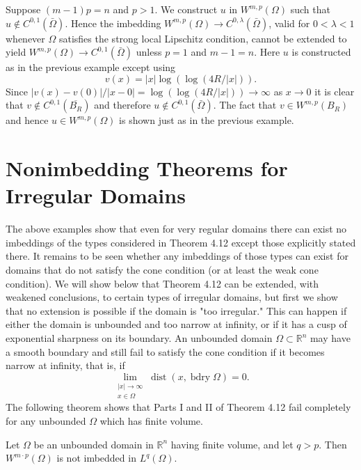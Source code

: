 \begin{example}
  Suppose $(m-1) p=n$ and $p>1$. We construct $u$ in $W^{m, p}(\Omega)$ such that $u \notin C^{0,1}(\bar{\Omega})$. Hence the imbedding $W^{m, p}(\Omega) \rightarrow C^{0, \lambda}(\bar{\Omega})$, valid for $0<\lambda<1$ whenever $\Omega$ satisfies the strong local Lipschitz condition,
  cannot be extended to yield $W^{m, p}(\Omega) \rightarrow C^{0,1}(\bar{\Omega})$ unless $p=1$ and $m-1=n$. Here $u$ is constructed as in the previous example except using
  \[
  v(x)=|x| \log (\log (4 R /|x|)) .
  \]
  Since $|v(x)-v(0)| /|x-0|=\log (\log (4 R /|x|)) \rightarrow \infty$ as $x \rightarrow 0$ it is clear that $v \notin C^{0,1}\left(\overline{B_R}\right)$ and therefore $u \notin C^{0,1}(\bar{\Omega})$. The fact that $v \in W^{m, p}\left(B_R\right)$ and hence $u \in W^{m, p}(\Omega)$ is shown just as in the previous example.
\end{example}


\section{Nonimbedding Theorems for Irregular Domains}

\begin{para}
  The above examples show that even for very regular domains there can exist no imbeddings of the types considered in Theorem 4.12 except those explicitly stated there. It remains to be seen whether any imbeddings of those types can exist for domains that do not satisfy the cone condition (or at least the weak cone condition). We will show below that Theorem 4.12 can be extended, with weakened conclusions, to certain types of irregular domains, but first we show that no extension is possible if the domain is "too irregular." This can happen if either the domain is unbounded and too narrow at infinity, or if it has a cusp of exponential sharpness on its boundary.
  An unbounded domain $\Omega \subset \mathbb{R}^n$ may have a smooth boundary and still fail to satisfy the cone condition if it becomes narrow at infinity, that is, if
  \[
  \lim _{\substack{|x| \rightarrow \infty \\ x \in \Omega}} \operatorname{dist}(x, \operatorname{bdry} \Omega)=0 .
  \]
  The following theorem shows that Parts I and II of Theorem 4.12 fail completely for any unbounded $\Omega$ which has finite volume.
\end{para}


\begin{theorem}
  Let $\Omega$ be an unbounded domain in $\mathbb{R}^n$ having finite volume, and let $q>p$. Then $W^{m \cdot p}(\Omega)$ is not imbedded in $L^q(\Omega)$.
\end{theorem}

